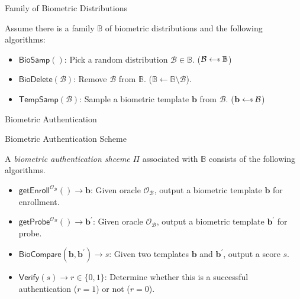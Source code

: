 \begin{frame}{Family of Biometric Distributions}

Assume there is a family $\mathbb{B}$ of biometric distributions and the following algorithms:
\pause

\begin{itemize}

	\item $\textsf{BioSamp}()$: Pick a random distribution $\mathcal{B} \in \mathbb{B}$. ($\mathcal{B} \getsdollar \mathbb{B}$)
	\pause

	\item $\textsf{BioDelete}(\mathcal{B})$: Remove $\mathcal{B}$ from $\mathbb{B}$. ($\mathbb{B} \gets \mathbb{B} \setminus \mathcal{B}$).
	\pause

	\item $\textsf{TempSamp}(\mathcal{B})$: Sample a biometric template $\mathbf{b}$ from $\mathcal{B}$. ($\mathbf{b} \getsdollar \mathcal{B}$)

\end{itemize}

\end{frame}


\begin{frame}{Biometric Authentication}

\begin{definition}{Biometric Authentication Scheme}

A \emph{biometric authentication shceme} $\Pi$ associated with $\mathbb{B}$ consists of the following algorithms.

\begin{itemize}

	\item<2-> $\textsf{getEnroll}^{\mathcal{O}_{\mathcal{B}}}() \to \mathbf{b}$: Given oracle $\mathcal{O}_{\mathcal{B}}$, output a biometric template $\mathbf{b}$ for enrollment.

	\item<3-> $\textsf{getProbe}^{\mathcal{O}_{\mathcal{B}}}() \to \mathbf{b}^\prime$: Given oracle $\mathcal{O}_{\mathcal{B}}$, output a biometric template $\mathbf{b}^\prime$ for probe.

	\item<4-> $\textsf{BioCompare}(\mathbf{b}, \mathbf{b}^\prime) \to s$: Given two templates $\mathbf{b}$ and $\mathbf{b}^\prime$, output a score $s$.

	\item<5-> $\textsf{Verify}(s) \to r \in \{0,1\}$: Determine whether this is a successful authentication ($r = 1$) or not ($r = 0$).

\end{itemize}

\end{definition}


\end{frame}



